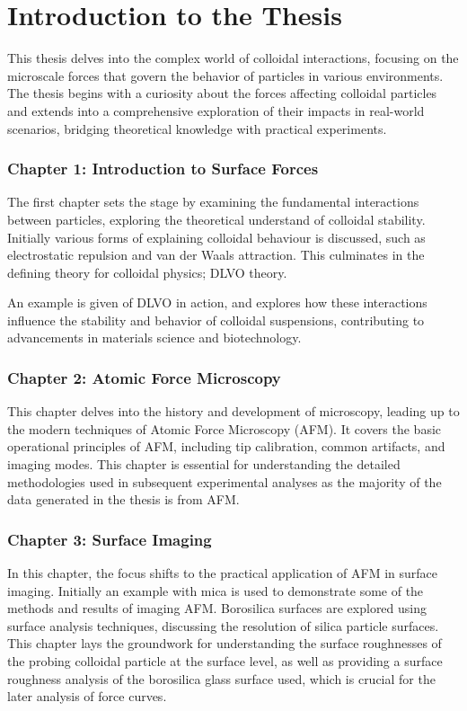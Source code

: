 \section{Introduction to the Thesis}

This thesis delves into the complex world of colloidal interactions, focusing on the microscale forces that govern the behavior of particles in various environments. The thesis begins with a curiosity about the forces affecting colloidal particles and extends into a comprehensive exploration of their impacts in real-world scenarios, bridging theoretical knowledge with practical experiments.

\subsubsection{Chapter 1: Introduction to Surface Forces}

The first chapter sets the stage by examining the fundamental interactions between particles, exploring the theoretical understand of colloidal stability. Initially various forms of explaining colloidal behaviour is discussed, such as electrostatic repulsion and van der Waals attraction. This culminates in the defining theory for colloidal physics; DLVO theory. 

An example is given of DLVO in action, and explores how these interactions influence the stability and behavior of colloidal suspensions, contributing to advancements in materials science and biotechnology.

\subsubsection{Chapter 2: Atomic Force Microscopy}
This chapter delves into the history and development of microscopy, leading up to the modern techniques of Atomic Force Microscopy (AFM). It covers the basic operational principles of AFM, including tip calibration, common artifacts, and imaging modes. This chapter is essential for understanding the detailed methodologies used in subsequent experimental analyses as the majority of the data generated in the thesis is from AFM.

\subsubsection{Chapter 3: Surface Imaging}
In this chapter, the focus shifts to the practical application of AFM in surface imaging. Initially an example with mica is used to demonstrate some of the methods and results of imaging AFM. Borosilica surfaces are explored using surface analysis techniques, discussing the resolution of silica particle surfaces. This chapter lays the groundwork for understanding the surface roughnesses of the probing colloidal particle at the surface level, as well as providing a surface roughness analysis of the borosilica glass surface used, which is crucial for the later analysis of force curves.

